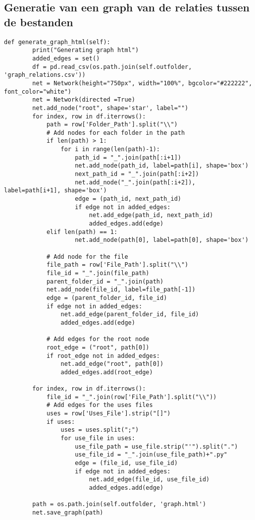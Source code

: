 \subsection{Generatie van een graph van de relaties tussen de bestanden}
\label{bijlage:generate-file-graph}

\begin{verbatim}
def generate_graph_html(self):
        print("Generating graph html")
        added_edges = set()
        df = pd.read_csv(os.path.join(self.outfolder, 'graph_relations.csv'))
        net = Network(height="750px", width="100%", bgcolor="#222222", font_color="white") 
        net = Network(directed =True)
        net.add_node("root", shape='star', label="")     
        for index, row in df.iterrows():
            path = row['Folder_Path'].split("\\")
            # Add nodes for each folder in the path
            if len(path) > 1:
                for i in range(len(path)-1):
                    path_id = "_".join(path[:i+1])
                    net.add_node(path_id, label=path[i], shape='box')
                    next_path_id = "_".join(path[:i+2])
                    net.add_node("_".join(path[:i+2]), label=path[i+1], shape='box')                        
                    edge = (path_id, next_path_id)
                    if edge not in added_edges:
                        net.add_edge(path_id, next_path_id)
                        added_edges.add(edge)
            elif len(path) == 1:
                    net.add_node(path[0], label=path[0], shape='box')

            # Add node for the file
            file_path = row['File_Path'].split("\\")
            file_id = "_".join(file_path)
            parent_folder_id = "_".join(path)
            net.add_node(file_id, label=file_path[-1])
            edge = (parent_folder_id, file_id)
            if edge not in added_edges:
                net.add_edge(parent_folder_id, file_id)
                added_edges.add(edge)

            # Add edges for the root node
            root_edge = ("root", path[0])
            if root_edge not in added_edges:
                net.add_edge("root", path[0])
                added_edges.add(root_edge)
        
        for index, row in df.iterrows():
            file_id = "_".join(row['File_Path'].split("\\"))
            # Add edges for the uses files
            uses = row['Uses_File'].strip("[]")
            if uses:
                uses = uses.split(";")
                for use_file in uses:
                    use_file_path = use_file.strip("'").split(".")
                    use_file_id = "_".join(use_file_path)+".py"
                    edge = (file_id, use_file_id)
                    if edge not in added_edges:
                        net.add_edge(file_id, use_file_id)
                        added_edges.add(edge)

        path = os.path.join(self.outfolder, 'graph.html')
        net.save_graph(path)
\end{verbatim}
